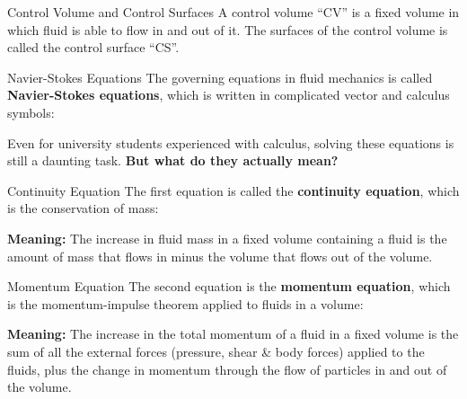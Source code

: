\documentclass[12pt,aspectratio=169]{beamer}
\begin{document}
\begin{frame}{Control Volume and Control Surfaces}
  A control volume ``CV'' is a fixed volume in which fluid is able to flow in
  and out of it. The surfaces of the control volume is called the control
  surface ``CS''.
  \begin{center}
  \end{center}
\end{frame}



\begin{frame}{Navier-Stokes Equations}
  The governing equations in fluid mechanics is called
  \textbf{Navier-Stokes equations}, which is written in complicated vector
  and calculus symbols:

  Even for university students experienced with calculus, solving these
  equations is still a daunting task. \textbf{But what do they actually mean?}
\end{frame}

\begin{frame}{Continuity Equation}
  The first equation is called the \textbf{continuity equation}, which is the
  conservation of mass:


  \textbf{Meaning:} The increase in fluid mass in a fixed volume containing a
  fluid is the amount of mass that flows in minus the volume that flows out of
  the volume.
\end{frame}


\begin{frame}{Momentum Equation}
  The second equation is the \textbf{momentum equation}, which is the 
  momentum-impulse theorem applied to fluids in a volume:


  \textbf{Meaning:} The increase in the total momentum of a fluid in a fixed
  volume is the sum of all the external forces (pressure, shear \& body forces)
  applied to the fluids, plus the change in momentum through the flow of
  particles in and out of the volume.
\end{frame}
\end{document}
